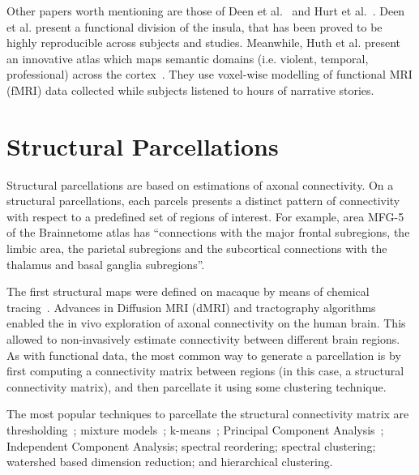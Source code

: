 Other papers worth mentioning are those of Deen et al.~\cite{Deen2011} and Hurt
et al.~\cite{Huth2016}. Deen et al. present a functional division
of the insula, that has been proved to be highly reproducible across subjects
and studies. Meanwhile, Huth et al. present an innovative atlas which maps semantic
domains (i.e. violent, temporal, professional) across the cortex~\cite{Huth2016}.
They use voxel-wise modelling of functional MRI (fMRI) data collected while 
subjects listened to hours of narrative stories.


\section{Structural Parcellations}
\label{sec:structural}
Structural parcellations are based on estimations of axonal connectivity. On
a structural parcellations, each parcels presents a distinct pattern of
connectivity with respect to a predefined set of regions of interest. For example,
area MFG-5 of the Brainnetome atlas has ``connections 
with the major frontal subregions, the limbic area, the parietal subregions
and the subcortical connections with the thalamus and basal ganglia subregions''\cite{Fan2016}.

The first structural maps were defined on macaque by means of chemical tracing~\cite{Stephan2013}.
Advances in Diffusion MRI (dMRI) and tractography algorithms enabled the in vivo
exploration of axonal connectivity on the human brain. This allowed to non-invasively
estimate connectivity between different brain regions. As with functional data,
the most common way to generate a parcellation is by first computing a connectivity matrix
between regions (in this case, a structural connectivity matrix), and then parcellate it using
some clustering technique.

The most popular techniques to parcellate the structural connectivity matrix
are thresholding~\cite{Behrens2003}; mixture models~\cite{Jbabdi2009, Clarkson2010, Paristot2015};
k-means~\cite{Anwander2006}; Principal Component Analysis~\cite{ThiebautdeSchotten2014, ThiebautdeSchotten2016};
Independent Component Analysis\cite{Muircheartaigh2018}; spectral reordering\cite{Bajada2017}; spectral clustering\cite{Fan2016};
watershed based dimension reduction\cite{Roca2009, Lefranc2016}; and hierarchical clustering\cite{Moreno-Dominguez2014, Gallardo2017a}.

